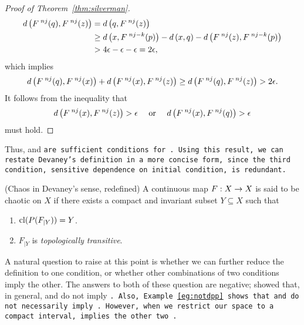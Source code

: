 \documentclass[10pt,draft,twoside]{book}
\begin{document}
\begin{proof}[Proof of Theorem~\ref{thm:silverman}]
\begin{align*}
    d\left( F^{\;nj}(q), F^{\;nj}(z) \right) 
    &= d\left( q, F^{\;nj}(z) \right)  \\
    &\geq  d\left( x, F^{\;nj-k}(p) \right) - d\left( x,q \right) - d\left( F^{\;nj}(z), F^{\;nj - k}(p) \right)  \\
    &> 4\epsilon - \epsilon - \epsilon 
    = 2\epsilon,
  \end{align*}
  which implies
  \begin{equation*}
    d\left( F^{\;nj}(q), F^{\;nj}(x) \right) + d\left( F^{\;nj}(x), F^{\;nj}(z) \right) 
    \geq d\left( F^{\;nj}(q), F^{\;nj}(z) \right)
    > 2\epsilon.
  \end{equation*}
  It follows from the inequality that 
  \begin{equation*}
    d\left( F^{\;nj}(x), F^{\;nj}(z) \right) > \epsilon \quad\mbox{ or }\quad d\left( F^{\;nj}(x), F^{\;nj}(q) \right) > \epsilon 
  \end{equation*}
  must hold.
\end{proof}

Thus, \dpp and \tt are sufficient conditions for \sdic.
Using this result, we can restate Devaney's definition in a more concise form, since the third condition, sensitive dependence on initial condition, is redundant.
\begin{definition}
  (Chaos in Devaney's sense, redefined) 
  A continuous map $F: X\rightarrow X$ is said to be chaotic on $X$ if there exists a compact and invariant subset $Y \subseteq X$ such that
  \begin{enumerate}
    \item $\mathrm{cl}(P(F_{|Y})) = Y$.
    \item $F_{|Y}$ is \textit{topologically transitive}.
  \end{enumerate}
\end{definition}
A natural question to raise at this point is whether we can further reduce the definition to one condition, or whether other combinations of two conditions imply the other.
The answers to both of these question are negative; \citet{assaf} showed that, in general, \dpp and \sdic do not imply \tt.
Also, Example~\ref{eg:notdpp} shows that \sdic and \tt do not necessarily imply \dpp.
However, when we restrict our space to a compact interval, \tt implies the other two \citep{silverman}.
\end{document}
